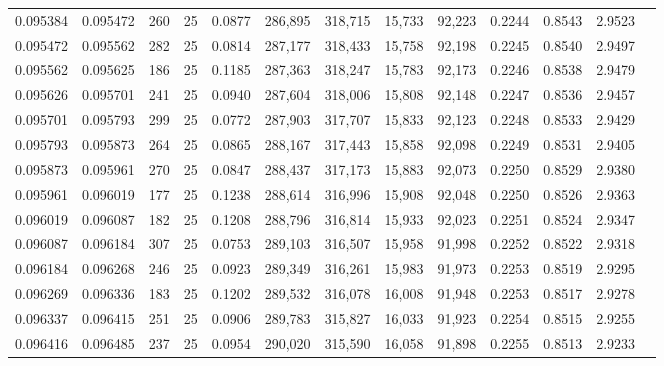\begin{tabular}{rrrrrrrrrrrrr}
0.095384 & 0.095472 &   260 &  25 &                                     0.0877 & 286,895 & 318,715 &  15,733 &  92,223 & 0.2244 & 0.8543 & 2.9523 \\
0.095472 & 0.095562 &   282 &  25 &                                     0.0814 & 287,177 & 318,433 &  15,758 &  92,198 & 0.2245 & 0.8540 & 2.9497 \\
0.095562 & 0.095625 &   186 &  25 &                                     0.1185 & 287,363 & 318,247 &  15,783 &  92,173 & 0.2246 & 0.8538 & 2.9479 \\
0.095626 & 0.095701 &   241 &  25 &                                     0.0940 & 287,604 & 318,006 &  15,808 &  92,148 & 0.2247 & 0.8536 & 2.9457 \\
0.095701 & 0.095793 &   299 &  25 &                                     0.0772 & 287,903 & 317,707 &  15,833 &  92,123 & 0.2248 & 0.8533 & 2.9429 \\
0.095793 & 0.095873 &   264 &  25 &                                     0.0865 & 288,167 & 317,443 &  15,858 &  92,098 & 0.2249 & 0.8531 & 2.9405 \\
0.095873 & 0.095961 &   270 &  25 &                                     0.0847 & 288,437 & 317,173 &  15,883 &  92,073 & 0.2250 & 0.8529 & 2.9380 \\
0.095961 & 0.096019 &   177 &  25 &                                     0.1238 & 288,614 & 316,996 &  15,908 &  92,048 & 0.2250 & 0.8526 & 2.9363 \\
0.096019 & 0.096087 &   182 &  25 &                                     0.1208 & 288,796 & 316,814 &  15,933 &  92,023 & 0.2251 & 0.8524 & 2.9347 \\
0.096087 & 0.096184 &   307 &  25 &                                     0.0753 & 289,103 & 316,507 &  15,958 &  91,998 & 0.2252 & 0.8522 & 2.9318 \\
0.096184 & 0.096268 &   246 &  25 &                                     0.0923 & 289,349 & 316,261 &  15,983 &  91,973 & 0.2253 & 0.8519 & 2.9295 \\
0.096269 & 0.096336 &   183 &  25 &                                     0.1202 & 289,532 & 316,078 &  16,008 &  91,948 & 0.2253 & 0.8517 & 2.9278 \\
0.096337 & 0.096415 &   251 &  25 &                                     0.0906 & 289,783 & 315,827 &  16,033 &  91,923 & 0.2254 & 0.8515 & 2.9255 \\
0.096416 & 0.096485 &   237 &  25 &                                     0.0954 & 290,020 & 315,590 &  16,058 &  91,898 & 0.2255 & 0.8513 & 2.9233 \\

\end{tabular}
